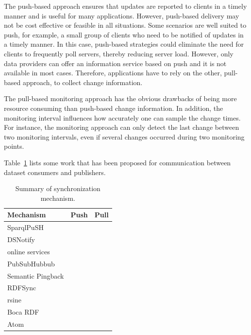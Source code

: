 \documentclass[sw]{iosart2x}
\newcommand{\cmark}{\ding{51}}%
\begin{document}
The push-based approach ensures that updates are reported to clients in a timely manner and is useful for many applications. However, push-based delivery may not be cost effective or feasible in all situations. Some scenarios are well suited to push, for example, a small group of clients who need to be notified of updates in a timely manner. In this case, push-based strategies could eliminate the need for clients to frequently poll servers, thereby reducing server load. However, only data providers can offer an information service based on push and it is not available in most cases. Therefore, applications have to rely on the other, pull-based approach, to collect change information. 

The pull-based monitoring approach has the obvious drawbacks of being more resource consuming than push-based change information. In addition, the monitoring interval influences how accurately one can sample the change times. For instance, the monitoring approach can only detect the last change between two monitoring intervals, even if several changes occurred during two monitoring points.

Table~\ref{tab:syn} lists some work that has been proposed for communication between dataset consumers and publishers.

\begin{table}[htbp]
	\centering
	\caption{Summary of synchronization mechanism.}
	\begin{tabular}{lcc}
		\hline
		Mechanism & Push & Pull \\ \hline
		SparqlPuSH \cite{PassantM10} & \cmark   & \\
		DSNotify \cite{PopitschH11} &   & \cmark \\
		online services\footnotemark & \cmark   & \\
		PubSubHubbub \cite{Fitzpatrick10} & \cmark   & \\
		Semantic Pingback \cite{TrampFEA10} & \cmark   & \\
		RDFSync \cite{TummarelloMBE07} &   &  \cmark  \\
		rsine \cite{MaderMS14} & \cmark   & \\
		Boca RDF \cite{MissierACDG07} & \cmark   & \\
		Atom \cite{Nottingham05} &    &  \cmark \\
		\hline
	\end{tabular}%
	\label{tab:syn}%
\end{table}%
\end{document}
